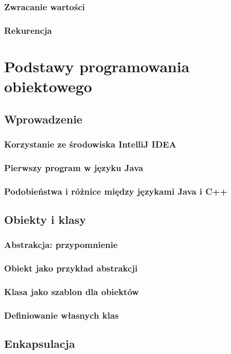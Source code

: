 \documentclass[11pt]{book}
\begin{document}
\section{Zwracanie wartości}
\section{Rekurencja}


\part{Podstawy programowania obiektowego}
\chapter{Wprowadzenie}
\section{Korzystanie ze środowiska IntelliJ IDEA}
\section{Pierwszy program w języku Java}
\section{Podobieństwa i różnice między językami Java i C++}

\chapter{Obiekty i klasy}
\section{Abstrakcja: przypomnienie}
\section{Obiekt jako przykład abstrakcji}
\section{Klasa jako szablon dla obiektów}
\section{Definiowanie własnych klas}

\chapter{Enkapsulacja}
\end{document}
